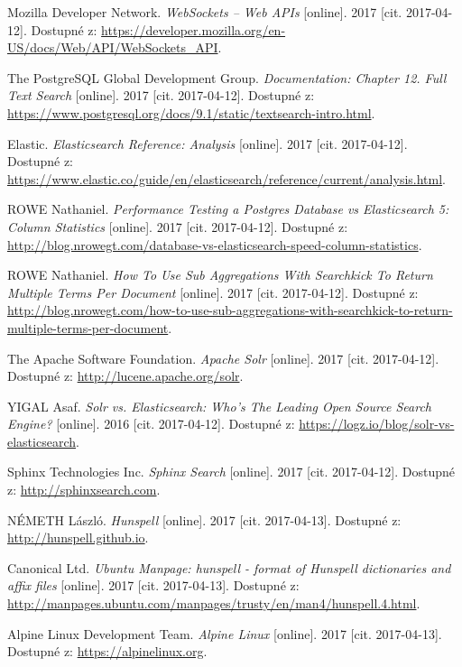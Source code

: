 \documentclass[FM,DP]{tulthesis}
\begin{document}
\begin{thebibliography}{Mm99}
 Mozilla Developer Network. \emph{WebSockets -- Web APIs} [online].
2017 [cit. 2017-04-12]. Dostupné z: \url{https://developer.mozilla.org/en-US/docs/Web/API/WebSockets_API}.

 The PostgreSQL Global Development Group. 
\emph{Documentation: Chapter 12. Full Text Search} [online].
2017 [cit. 2017-04-12]. Dostupné z: \url{https://www.postgresql.org/docs/9.1/static/textsearch-intro.html}.

 Elastic. \emph{Elasticsearch Reference: Analysis} [online].
2017 [cit. 2017-04-12]. Dostupné z: \url{https://www.elastic.co/guide/en/elasticsearch/reference/current/analysis.html}.

 ROWE Nathaniel. 
\emph{Performance Testing a Postgres Database vs Elasticsearch 5: Column Statistics} [online].
2017 [cit. 2017-04-12]. Dostupné z: \url{http://blog.nrowegt.com/database-vs-elasticsearch-speed-column-statistics}.

 ROWE Nathaniel. 
\emph{How To Use Sub Aggregations With Searchkick To Return Multiple Terms Per Document} [online].
2017 [cit. 2017-04-12]. Dostupné z: 
\url{http://blog.nrowegt.com/how-to-use-sub-aggregations-with-searchkick-to-return-multiple-terms-per-document}.

 The Apache Software Foundation. \emph{Apache Solr} [online].
2017 [cit. 2017-04-12]. Dostupné z: \url{http://lucene.apache.org/solr}.

 YIGAL Asaf. \emph{Solr vs. Elasticsearch: Who’s The Leading Open Source Search Engine?} [online].
2016 [cit. 2017-04-12]. Dostupné z: \url{https://logz.io/blog/solr-vs-elasticsearch}.

 Sphinx Technologies Inc. \emph{Sphinx Search} [online].
2017 [cit. 2017-04-12]. Dostupné z: \url{http://sphinxsearch.com}.

 NÉMETH László. \emph{Hunspell} [online].
2017 [cit. 2017-04-13]. Dostupné z: \url{http://hunspell.github.io}.

 Canonical Ltd. 
\emph{Ubuntu Manpage: hunspell - format of Hunspell dictionaries and affix files} [online].
2017 [cit. 2017-04-13]. Dostupné z: \url{http://manpages.ubuntu.com/manpages/trusty/en/man4/hunspell.4.html}.

 Alpine Linux Development Team. \emph{Alpine Linux} [online].
2017 [cit. 2017-04-13]. Dostupné z: \url{https://alpinelinux.org}.


\end{thebibliography}
\end{document}
